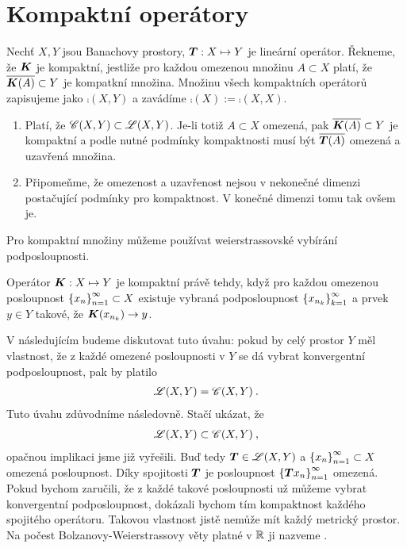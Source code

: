 \section{Kompaktní operátory}

\begin{definition}
Nechť $X,Y$ jsou Banachovy prostory, $\boldsymbol{T}: X \mapsto Y$ je lineární operátor. Řekneme, že $\boldsymbol{K}$ je kompaktní, jestliže pro každou omezenou množinu $A \subset X$ platí, že $\overline{\boldsymbol{K}(A)} \subset Y$ je kompatkní množina. Množinu všech kompaktních operátorů zapisujeme jako $\comp(X,Y)$ a zavádíme $\comp(X) := \comp(X,X)$.
\end{definition}

\begin{remark}
\begin{enumerate}
    \item Platí, že $\mathscr{C}(X,Y) \subset \mathscr{L}(X,Y)$. Je-li totiž $A \subset X$ omezená, pak $\overline{\boldsymbol{K}(A)} \subset Y$ je kompaktní a podle nutné podmínky kompaktnosti musí být $\overline{\boldsymbol{T}(A)} $ omezená a uzavřená množina.
    \item Připomeňme, že omezenost a uzavřenost nejsou v nekonečné dimenzi postačující podmínky pro kompaktnost. V konečné dimenzi tomu tak ovšem je.
\end{enumerate}
\end{remark}
Pro kompaktní množiny můžeme používat weierstrassovské vybírání podposloupnosti.
\begin{theorem}
Operátor $\boldsymbol{K} :X \mapsto Y$ je kompaktní právě tehdy, když pro každou omezenou posloupnost $\left \lbrace x_n \right \rbrace_{n=1}^\infty \subset X$ existuje vybraná podposloupnost $\left \lbrace x_{n_k} \right \rbrace_{k=1}^\infty $ a prvek $y \in Y$ takové, že $\boldsymbol{K} ( x_{n_k}) \rightarrow y $.
\end{theorem}

V následujícím budeme diskutovat tuto úvahu: pokud by celý prostor $Y$ měl vlastnost, že z každé omezené posloupnosti v $Y$ se dá vybrat konvergentní podposloupnost, pak by platilo \begin{align*}
    \mathscr{L}(X,Y) = \mathscr{C} (X,Y) \:.
\end{align*}
Tuto úvahu zdůvodníme následovně. Stačí ukázat, že 
\begin{align*}
    \mathscr{L}(X,Y) \subset \mathscr{C} (X,Y) \:,
\end{align*}
opačnou implikaci jsme již vyřešili. Buď tedy $\boldsymbol{T} \in \mathscr{L}(X,Y)$ a $\left \lbrace x_n \right \rbrace_{n=1}^\infty \subset X$ omezená posloupnost.
Díky spojitosti $\boldsymbol{T}$ je posloupnost $ \left \lbrace  \boldsymbol{T} x_n \right \rbrace_{n=1}^\infty$ omezená. Pokud bychom zaručili, že z každé takové posloupnosti už můžeme vybrat konvergentní podposloupnost, dokázali bychom tím kompaktnost každého spojitého operátoru. Takovou vlastnost jistě nemůže mít každý metrický prostor. Na počest Bolzanovy-Weierstrassovy věty platné v $\mathbb{R}$ ji nazveme .

